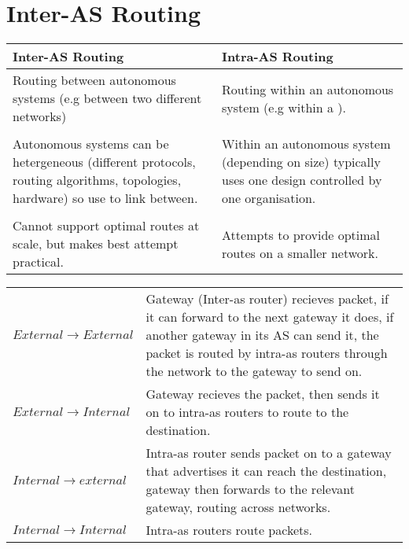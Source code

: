 \documentclass{report}
\begin{document}
\section*{Inter-AS Routing}
\begin{center}
	\begin{tabular}{p{} | p{}}
		\textbf{Inter-AS Routing}                                                 & \textbf{Intra-AS Routing}                                                                                 \\
		\hline
		Routing between autonomous systems (e.g between two different networks)   & Routing within an autonomous system (e.g within a \keyword{LAN}).                                         \\
		\\
		Autonomous systems can be hetergeneous (different protocols, routing algorithms, topologies, hardware) so use \keyword{Gateways} to link between.
		                                                                          & Within an autonomous system (depending on size) typically uses one design controlled by one organisation. \\
		\\
		Cannot support optimal routes at scale, but makes best attempt practical. & Attempts to provide optimal routes on a smaller network.                                                  \\
	\end{tabular}
\end{center}
\begin{center}
	\begin{tabular}{l p{}}
		$External \to External$ & Gateway (Inter-as router) recieves packet, if it can forward to the next gateway it does, if another gateway in its AS can send it, the packet is routed by intra-as routers through the network to the gateway to send on. \\
		$External \to Internal$ & Gateway recieves the packet, then sends it on to intra-as routers to route to the destination.                                                                                                                              \\
		$Internal \to external$ & Intra-as router sends packet on to a gateway that advertises it can reach the destination, gateway then forwards to the relevant gateway, routing across networks.                                                          \\
		$Internal \to Internal$ & Intra-as routers route packets.                                                                                                                                                                                             \\
	\end{tabular}
\end{center}
\end{document}
